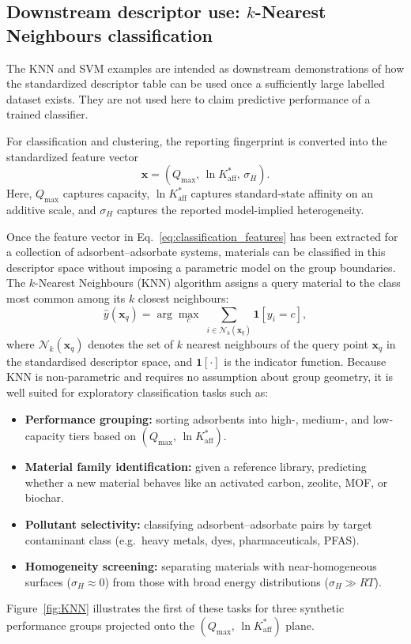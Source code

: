 \documentclass[journal=jacsat,manuscript=article]{achemso}
\begin{document}
	\subsection{Downstream descriptor use: $k$-Nearest Neighbours classification}
	\label{sec:KNN}

	
The KNN and SVM examples are intended as downstream demonstrations of how the standardized descriptor table can be used once a sufficiently large labelled dataset exists. They are not used here to claim predictive performance of a trained classifier.

For classification and clustering, the reporting fingerprint is converted into the standardized feature vector 
\begin{equation}
	\mathbf{x}
	=
	\left(
	Q_{\max},\,
	\ln K_{\mathrm{aff}}^{\ast},\,
	\sigma_H
	\right).
	\label{eq:classification_features}
\end{equation}
Here, \(Q_{\max}\) captures capacity, \(\ln K_{\mathrm{aff}}^{\ast}\) captures standard-state affinity on an additive scale, and \(\sigma_H\) captures the reported model-implied heterogeneity.

Once the feature vector in Eq.~\eqref{eq:classification_features} has been extracted for a collection of adsorbent--adsorbate systems, materials can be classified in this descriptor space without imposing a parametric model on the group boundaries.
The $k$-Nearest Neighbours (KNN) algorithm assigns a query material to the class most common among its $k$ closest neighbours:
	\begin{equation}
		\hat{y}(\mathbf{x}_q)
		= \arg\max_{c}\;
		\sum_{i \in \mathcal{N}_k(\mathbf{x}_q)} \mathbf{1}[y_i = c],
		\label{eq:KNN}
	\end{equation}
	where $\mathcal{N}_k(\mathbf{x}_q)$ denotes the set of $k$ nearest neighbours of the query point $\mathbf{x}_q$ in the standardised descriptor space, and $\mathbf{1}[\cdot]$ is the indicator function. Because KNN is non-parametric and requires no assumption about group geometry, it is well suited for exploratory classification tasks such as:
	\begin{itemize}
		\item \textbf{Performance grouping:} sorting adsorbents into high-, medium-, and low-capacity tiers based on $(Q_{\max},\, \ln K_{\mathrm{aff}}^{\ast})$.
		\item \textbf{Material family identification:} given a reference library, predicting whether a new material behaves like an activated carbon, zeolite, MOF, or biochar.
		\item \textbf{Pollutant selectivity:} classifying adsorbent--adsorbate pairs by target contaminant class (e.g.\ heavy metals, dyes, pharmaceuticals, PFAS).
		\item \textbf{Homogeneity screening:} separating materials with near-homogeneous surfaces ($\sigma_H \approx 0$) from those with broad energy distributions ($\sigma_H \gg RT$).
	\end{itemize}
	Figure~\ref{fig:KNN} illustrates the first of these tasks for three synthetic performance groups projected onto the $(Q_{\max},\, \ln K_{\mathrm{aff}}^{\ast})$ plane.
\end{document}
